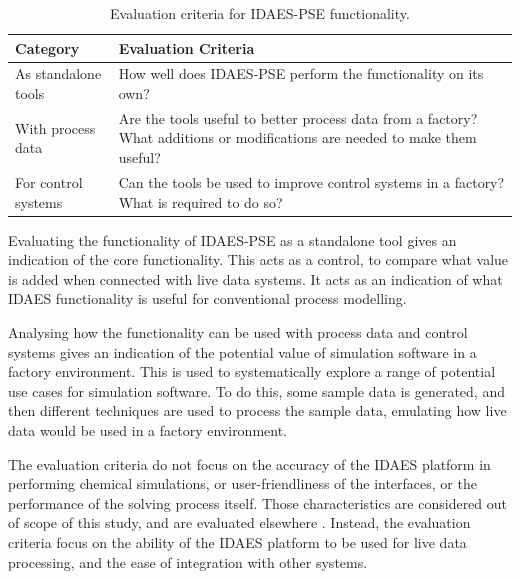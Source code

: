 \documentclass[12pt]{article}
\begin{document}
\begin{table}[h]
    \centering
    \begin{tabular}{|l|p{10cm}|}
        \hline
        \textbf{Category} & \textbf{Evaluation Criteria} \\
        \hline
        As standalone tools & How well does IDAES-PSE perform the functionality on its own? \\
        \hline
        With process data & Are the tools useful to better process data from a factory? What additions or modifications are needed to make them useful? \\
        \hline
        For control systems & Can the tools be used to improve control systems in a factory? What  is required to do so? \\
        \hline
    \end{tabular}
    \caption{Evaluation criteria for IDAES-PSE functionality.}
    \label{tab:evaluation_criteria}
\end{table}

Evaluating the functionality of IDAES-PSE as a standalone tool gives an indication of the core functionality. This acts as a control, to compare what value is added when connected with live data systems. It acts as an indication of what IDAES functionality is useful for conventional process modelling.

Analysing how the functionality can be used with process data and control systems gives an indication of the potential value of simulation software in a factory environment. This is used to systematically explore a range of potential use cases for simulation software. 
To do this, some sample data is generated, and then different techniques are used to process the sample data, emulating how live data would be used in a factory environment.

The evaluation criteria do not focus on the accuracy of the IDAES platform in performing chemical simulations, or user-friendliness of the interfaces, or the performance of the solving process itself. Those characteristics are considered out of scope of this study, and are evaluated elsewhere \cite{hart2011pyomo} \cite{myhre2022investigation}. Instead, the evaluation criteria focus on the ability of the IDAES platform to be used for live data processing, and the ease of integration with other systems.



\end{document}
